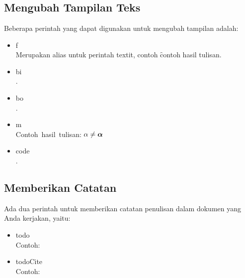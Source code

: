 \chapter{\babLima}


\section{Mengubah Tampilan Teks}
Beberapa perintah yang dapat digunakan untuk mengubah tampilan adalah: 
\begin{itemize}
	\item \bslash f \\
		Merupakan alias untuk perintah \bslash textit, contoh 
		\f{contoh hasil tulisan}.
	\item \bslash bi \\
		.
	\item \bslash bo \\
		.
	\item \bslash m \\
		Contoh\ hasil\ tulisan: $\alpha \not= \bm{\alpha}$
	\item \bslash code \\ 
		.
\end{itemize}


\section{Memberikan Catatan}
Ada dua perintah untuk memberikan catatan penulisan dalam dokumen yang Anda 
kerjakan, yaitu: 
\begin{itemize}
	\item \bslash todo \\
		Contoh: \\ 
	\item \bslash todoCite \\ 
		Contoh: \todoCite
\end{itemize}


